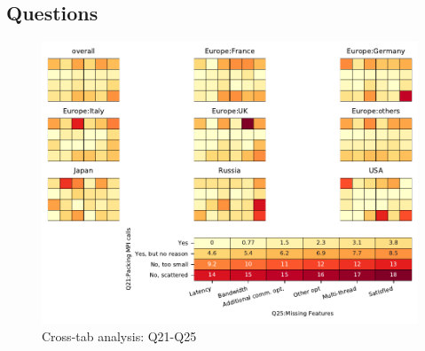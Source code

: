 
\subsection{Questions}


\begin{figure}
\begin{center}
\includegraphics[width=12cm]{../pdfs/Q21-Q25.pdf}
\caption{Cross-tab analysis: Q21-Q25}
\label{fig:Q21-Q25}
\end{center}
\end{figure}
